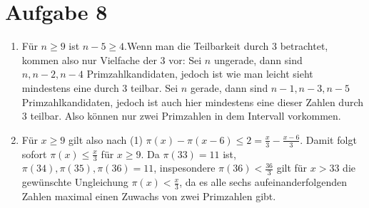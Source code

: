 \section*{Aufgabe 8}
\begin{enumerate}[(1)]

\item Für $n \geq 9$ ist $n-5 \geq 4$.Wenn man die Teilbarkeit durch 3 betrachtet, kommen also nur Vielfache der 3 vor:
Sei $n$ ungerade, dann sind $n, n-2, n-4$ Primzahlkandidaten, jedoch ist wie man leicht sieht mindestens eine durch 3 teilbar.
Sei $n$ gerade, dann sind $n-1, n-3, n-5$ Primzahlkandidaten, jedoch ist auch hier mindestens eine dieser Zahlen durch 3 teilbar.
Also können nur zwei Primzahlen in dem Intervall vorkommen.

\item Für $x \geq 9$ gilt also nach (1) $\pi(x) - \pi(x-6) \leq 2 = \frac{x}{3} - \frac{x-6}{3}$. Damit folgt sofort $\pi(x) \leq \frac{x}{3}$ für $x \geq 9$. 
Da $\pi(33) = 11$ ist, $\pi(34), \pi(35), \pi(36) = 11$, inspesondere $\pi(36) < \frac{36}{3}$ gilt für $x > 33$ die gewünschte Ungleichung $\pi(x) < \frac{x}{3}$,
 da es alle sechs aufeinanderfolgenden Zahlen maximal einen Zuwachs von zwei Primzahlen gibt.

\end{enumerate}


